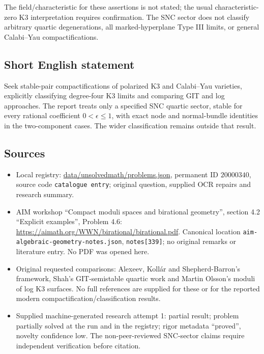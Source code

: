 \documentclass[11pt]{article}
\begin{document}
The field/characteristic for these assertions is not stated; the usual characteristic-zero K3 interpretation requires confirmation. The SNC sector does not classify arbitrary quartic degenerations, all marked-hyperplane Type III limits, or general Calabi--Yau compactifications.
\subsection{Short English statement}
Seek stable-pair compactifications of polarized K3 and Calabi--Yau varieties, explicitly classifying degree-four K3 limits and comparing GIT and log approaches. The report treats only a specified SNC quartic sector, stable for every rational coefficient $0<\epsilon\leq1$, with exact node and normal-bundle identities in the two-component cases. The wider classification remains outside that result.
\subsection{Sources}
\begin{itemize}
\item Local registry: \url{data/unsolvedmath/problems.json}, permanent ID $20000340$, source code \texttt{catalogue entry}; original question, supplied OCR repairs and research summary.
\item AIM workshop ``Compact moduli spaces and birational geometry'', section 4.2 ``Explicit examples'', Problem 4.6: \url{https://aimath.org/WWN/birational/birational.pdf}. Canonical location \texttt{aim-algebraic-geometry-notes.json}, \texttt{notes[339]}; no original remarks or literature entry. No PDF was opened here.
\item Original requested comparisons: Alexeev, Koll\'ar and Shepherd-Barron's framework, Shah's GIT-semistable quartic work and Martin Olsson's moduli of log K3 surfaces. No full references are supplied for these or for the reported modern compactification/classification results.
\item Supplied machine-generated research attempt 1: partial result; problem partially solved at the run and in the registry; rigor metadata ``proved'', novelty confidence low. The non-peer-reviewed SNC-sector claims require independent verification before citation.
\end{itemize}
\end{document}
